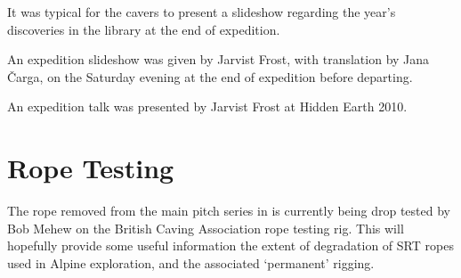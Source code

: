     \begin{marginfigure}
\checkoddpage \ifoddpage \forcerectofloat \else \forceversofloat \fi
\centering
 \caption{It was typical for the  cavers to present a slideshow regarding the year's discoveries in the \protect{} library at the end of expedition. }
 \label{Tolmin slideshow 2009}
\end{marginfigure}

An expedition slideshow was given by Jarvist Frost, with translation by Jana Čarga, on the Saturday evening at the end of expedition before departing.

An expedition talk was presented by Jarvist Frost at Hidden Earth 2010.




\section{Rope Testing}

The rope removed from the main pitch series in  is currently being
drop tested by Bob Mehew on the British Caving Association rope testing rig. This will hopefully provide some useful information the extent of degradation of SRT ropes used in
Alpine exploration, and the associated `permanent' rigging.
